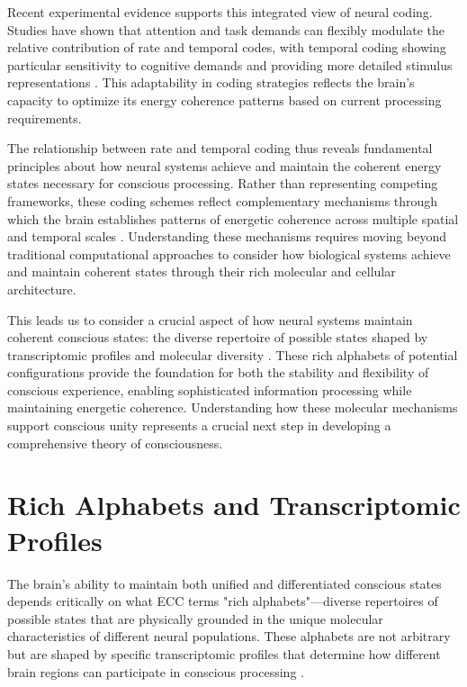 \begin{refsection}
Recent experimental evidence supports this integrated view of neural coding. Studies have shown that attention and task demands can flexibly modulate the relative contribution of rate and temporal codes, with temporal coding showing particular sensitivity to cognitive demands and providing more detailed stimulus representations \cite{zhang2023adaptive}. This adaptability in coding strategies reflects the brain's capacity to optimize its energy coherence patterns based on current processing requirements.

The relationship between rate and temporal coding thus reveals fundamental principles about how neural systems achieve and maintain the coherent energy states necessary for conscious processing. Rather than representing competing frameworks, these coding schemes reflect complementary mechanisms through which the brain establishes patterns of energetic coherence across multiple spatial and temporal scales \cite{lisman2013theta}. Understanding these mechanisms requires moving beyond traditional computational approaches to consider how biological systems achieve and maintain coherent states through their rich molecular and cellular architecture.

This leads us to consider a crucial aspect of how neural systems maintain coherent conscious states: the diverse repertoire of possible states shaped by transcriptomic profiles and molecular diversity \cite{zhang2023adaptive}. These rich alphabets of potential configurations provide the foundation for both the stability and flexibility of conscious experience, enabling sophisticated information processing while maintaining energetic coherence. Understanding how these molecular mechanisms support conscious unity represents a crucial next step in developing a comprehensive theory of consciousness.

\section{Rich Alphabets and Transcriptomic Profiles}

The brain's ability to maintain both unified and differentiated conscious states depends critically on what ECC terms "rich alphabets"—diverse repertoires of possible states that are physically grounded in the unique molecular characteristics of different neural populations. These alphabets are not arbitrary but are shaped by specific transcriptomic profiles that determine how different brain regions can participate in conscious processing \cite{tasic2018shared, siletti2023transcriptomic}.


\end{refsection}
